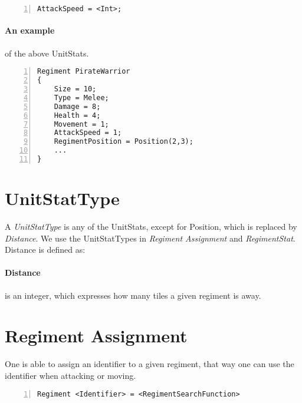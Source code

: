		\begin{lstlisting}[basicstyle=\small\sffamily,
		keywordstyle={\color{blue}},
		comment={[l]{//}}, morecomment={[s]{/*}{*/}}, commentstyle=\itshape,
		columns={[l]flexible}, numbers=left, numberstyle=\tiny,
		frameround=fftt, frame=shadowbox, captionpos=b,
		caption={AttackSpeed of the regiment}]
AttackSpeed = <Int>;
			\end{lstlisting}
			
\paragraph{An example} of the above UnitStats.
		\begin{lstlisting}[basicstyle=\small\sffamily,
		keywordstyle={\color{blue}},
		comment={[l]{//}}, morecomment={[s]{/*}{*/}}, commentstyle=\itshape,
		columns={[l]flexible}, numbers=left, numberstyle=\tiny,
		frameround=fftt, frame=shadowbox, captionpos=b,
		caption={Example: Using the UnitStats}]
Regiment PirateWarrior
{
	Size = 10;
	Type = Melee;
	Damage = 8;
	Health = 4;
	Movement = 1;
	AttackSpeed = 1;
	RegimentPosition = Position(2,3);
	...
}
\end{lstlisting}
			

\section{UnitStatType}
	A {\it UnitStatType} is any of the UnitStats, except for Position, which is replaced by {\it Distance}. We use the UnitStatTypes in 
	{\it Regiment Assignment} and {\it RegimentStat}.
	Distance is defined as:
	\paragraph{Distance} is an integer, which expresses how many tiles a given regiment is away.

\section{Regiment Assignment}
\label{doc:regass}
	One is able to assign an identifier to a given regiment, that way one can use the identifier when attacking or moving.
	
		\begin{lstlisting}[basicstyle=\small\sffamily, keywordstyle={\color{blue}}, comment={[l]{//}}, morecomment={[s]{/*}{*/}}, commentstyle=\itshape, columns={[l]flexible}, numbers=left, numberstyle=\tiny, frameround=fftt, frame=shadowbox, captionpos=b,
		caption={Regiment Assignment}]
Regiment <Identifier> = <RegimentSearchFunction>			
		\end{lstlisting}	

